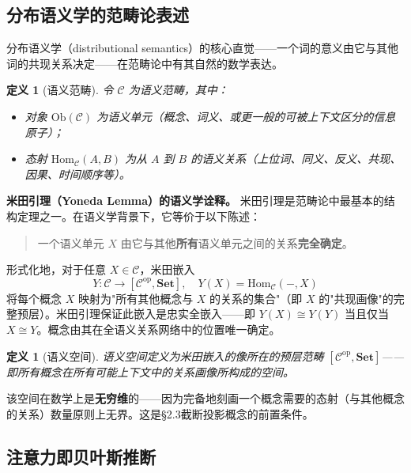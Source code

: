 \documentclass[11pt,a4paper]{ctexart}
\newtheorem{definition}[theorem]{定义}
\begin{document}
\subsection{分布语义学的范畴论表述}

分布语义学（distributional semantics）的核心直觉——一个词的意义由它与其他词的共现关系决定——在范畴论中有其自然的数学表达。

\begin{definition}[语义范畴]
    令 $\mathcal{C}$ 为语义范畴，其中：
    \begin{itemize}
        \item 对象 $\mathrm{Ob}(\mathcal{C})$ 为语义单元（概念、词义、或更一般的可被上下文区分的信息原子）；
        \item 态射 $\mathrm{Hom}_{\mathcal{C}}(A,B)$ 为从 $A$ 到 $B$ 的语义关系（上位词、同义、反义、共现、因果、时间顺序等）。
    \end{itemize}
\end{definition}

\textbf{米田引理（Yoneda Lemma）的语义学诠释。} 米田引理是范畴论中最基本的结构定理之一。在语义学背景下，它等价于以下陈述：

\begin{quote}
    一个语义单元 $X$ 由它与其他\textbf{所有}语义单元之间的关系\textbf{完全确定}。
\end{quote}

形式化地，对于任意 $X \in \mathcal{C}$，米田嵌入
\begin{equation}
    Y: \mathcal{C} \to [\mathcal{C}^{\mathrm{op}}, \mathbf{Set}], \quad
    Y(X) = \mathrm{Hom}_{\mathcal{C}}(-, X)
\end{equation}
将每个概念 $X$ 映射为"所有其他概念与 $X$ 的关系的集合"（即 $X$ 的"共现画像"的完整预层）。米田引理保证此嵌入是忠实全嵌入——即 $Y(X) \cong Y(Y)$ 当且仅当 $X \cong Y$。概念由其在全语义关系网络中的位置唯一确定。

\begin{definition}[语义空间]
    语义空间定义为米田嵌入的像所在的预层范畴 $[\mathcal{C}^{\mathrm{op}}, \mathbf{Set}]$——即所有概念在所有可能上下文中的关系画像所构成的空间。
\end{definition}

该空间在数学上是\textbf{无穷维}的——因为完备地刻画一个概念需要的态射（与其他概念的关系）数量原则上无界。这是§2.3截断投影概念的前置条件。

\subsection{注意力即贝叶斯推断}
\end{document}
